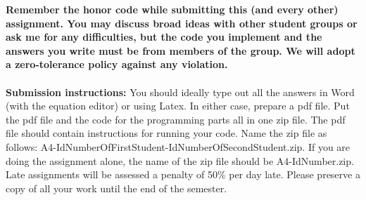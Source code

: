 \documentclass[11pt]{article}
\begin{document}
\maketitle

\textbf{Remember the honor code while submitting this (and every other) assignment. You may discuss broad ideas with other student groups or ask me for any difficulties, but the code you implement and the answers you write must be from members of the group. We will adopt a \textbf{zero-tolerance policy} against any violation.}
\\
\\
\textbf{Submission instructions:} You should ideally type out all the answers in Word (with the equation editor) or using Latex. In either case, prepare a pdf file. Put the pdf file and the code for the programming parts all in one zip file. The pdf file should contain instructions for running your code. Name the zip file as follows: A4-IdNumberOfFirstStudent-IdNumberOfSecondStudent.zip. If you are doing the assignment alone, the name of the zip file should be A4-IdNumber.zip. Late assignments will be assessed a penalty of 50\% per day late. Please preserve a copy of all your work until the end of the semester. 
\end{document}
